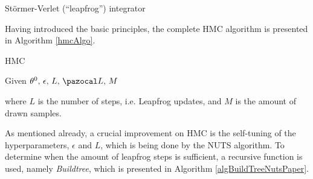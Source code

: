 \begin{algorithm}[H]
    \caption{St\"{o}rmer-Verlet (``leapfrog'') integrator}
    \label{alg1NutsPaper}
    
\end{algorithm}

\newpage

Having introduced the basic principles, the complete \gls{HMC} algorithm is presented in Algorithm \ref{hmcAlgo}.\\

\begin{algorithm}[H]
    \caption{\acrfull{HMC}}
    \label{hmcAlgo}
    
    Given $\theta^0, \, \epsilon, \, L,\,\ccal{L},\, M$
\end{algorithm}

\vspace{0.5cm}

where $L$ is the number of steps, i.e. Leapfrog updates, and $M$ is the amount of drawn samples.\\

\newpage

As mentioned already, a crucial improvement on \gls{HMC} is the self-tuning of the hyperparameters, $\epsilon$ and $L$, which is being done by the \gls{NUTS} algorithm. To determine when the amount of leapfrog steps is sufficient, a recursive function is used, namely \textit{Buildtree}, which is presented in Algorithm \ref{algBuildTreeNutsPaper}.\\


